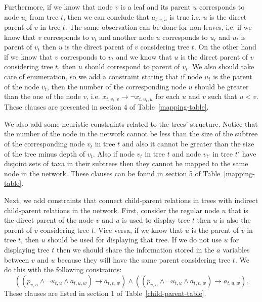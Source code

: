 \documentclass[runningheads, envcountsame, a4paper]{llncs}
\begin{document}
Furthermore, if we know that node $v$ is a leaf and its parent $u$ corresponds to node $u_t$ from tree $t$, 
then we can conclude that $a_{t,v,u}$ is true i.e. $u$ is the direct parent of $v$ in tree $t$. The same observation 
can be done for non-leaves, i.e. if we know that $v$ corresponds to $v_t$ and another node $u$ corresponds to $u_t$ 
and $u_t$ is parent of $v_t$ then $u$ is the direct parent of $v$ considering tree $t$. On the other hand if we know 
that $v$ corresponds to $v_t$ and we know that $u$ is the direct parent of $v$ considering tree $t$, then $u$ should 
correspond to parent of $v_t$. We also should take care of enumeration, so we add a constraint stating that if node 
$u_t$ is the parent of the node $v_t$, then the number of the corresponding node $u$ should be greater than the one of 
the node $v$, i.e. $x_{t,v_t,v} \rightarrow \neg x_{t,u_t,u}$ for each $u$ and $v$ such that $u < v$. These clauses are
presented in section 4 of Table~\ref{mapping-table}.

We also add some heuristic constraints related to the trees' structure. Notice that the number of the node in the network 
cannot be less than the  size of the subtree of the corresponding node $v_t$ in tree $t$ and also it cannot be greater than 
the size of the tree minus depth of $v_t$. Also if node $v_t$ in tree $t$ and node $v_{t'}$ in tree $t'$ have disjoint sets of 
taxa in their subtrees then they cannot be mapped to the same node in the network. These clauses can be found in section 5 of 
Table~\ref{mapping-table}.

Next, we add constraints that connect child-parent relations in trees with indirect child-parent relations in 
the network. First, consider the regular node $u$ that is the direct parent of the node $v$ and $u$ is used 
to display tree $t$ then $u$ is also the parent of $v$ considering tree $t$. 
Vice versa, if we know that $u$ is the parent of $v$ in tree $t$, then 
$u$ should be used for displaying that tree. If we do not use $u$ for displaying tree $t$ then we should share the 
information stored in the $a$ variables between $v$ and $u$ because they will have the same parent considering tree $t$. 
We do this with the following constraints:
$$\left(\left(p_{v,u} \wedge \neg u_{t,u} \wedge a_{t,u,w}\right) \rightarrow a_{t,v,w}\right)
\wedge \left( \left(p_{v,u} \wedge \neg u_{t,u} \wedge a_{t,v,w}\right) \rightarrow a_{t,u,w} \right).$$
These clauses are listed in section 1 of Table~\ref{child-parent-table}.
\end{document}
